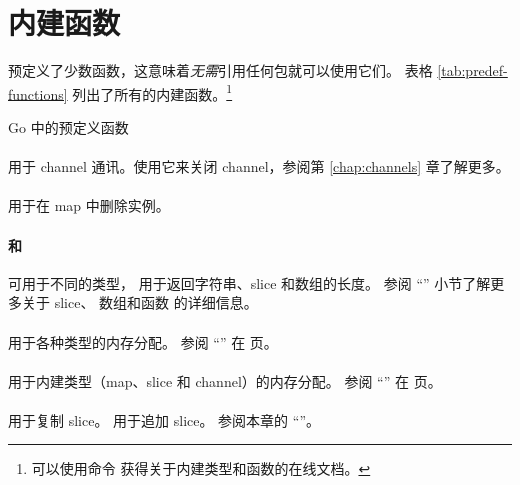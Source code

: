 \section{内建函数}
预定义了少数函数，这意味着\emph{无需}引用任何包就可以使用它们。
表格 \ref{tab:predef-functions} 列出了所有的内建函数。\footnote{可以使用命令
 获得关于内建类型和函数的在线文档。}

\begin{table}[H]
\begin{center}
\caption{Go 中的预定义函数}
\label{tab:predef-functions}

\end{center}
\end{table}

\paragraph{} 用于 channel
通讯。使用它来关闭 channel，参阅第 \ref{chap:channels} 章了解更多。

\paragraph{} 用于在 map 中删除实例。

\paragraph{ 和 } 可用于不同的类型，
 用于返回字符串、slice 和数组的长度。
参阅 ``'' 小节了解更多关于 slice、
数组和函数  的详细信息。

\paragraph{} 用于各种类型的内存分配。
参阅 ``'' 在 \pageref{sec:allocation with new} 页。

\paragraph{} 用于内建类型（map、slice 和 channel）的内存分配。
参阅 ``'' 在 \pageref{sec:allocation with make} 页。

\paragraph{} 用于复制 slice。 用于追加 slice。
参阅本章的 ``''。

